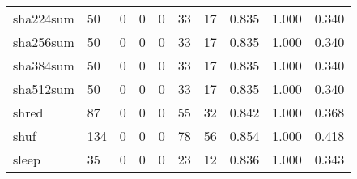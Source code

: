 \begin{longtable}{lp{1.3cm}p{1.3cm}p{1.3cm}p{1.3cm}p{1.3cm}p{1.3cm}p{1.3cm}p{1.3cm}p{1.3cm}}
sha224sum &                     50 &                                             0 &                                            0 &                                           0 &                                           33 &                                         17 &                                0.835 &                                  1.000 &                                0.340 \\
sha256sum &                     50 &                                             0 &                                            0 &                                           0 &                                           33 &                                         17 &                                0.835 &                                  1.000 &                                0.340 \\
sha384sum &                     50 &                                             0 &                                            0 &                                           0 &                                           33 &                                         17 &                                0.835 &                                  1.000 &                                0.340 \\
sha512sum &                     50 &                                             0 &                                            0 &                                           0 &                                           33 &                                         17 &                                0.835 &                                  1.000 &                                0.340 \\
shred     &                     87 &                                             0 &                                            0 &                                           0 &                                           55 &                                         32 &                                0.842 &                                  1.000 &                                0.368 \\
shuf      &                    134 &                                             0 &                                            0 &                                           0 &                                           78 &                                         56 &                                0.854 &                                  1.000 &                                0.418 \\
sleep     &                     35 &                                             0 &                                            0 &                                           0 &                                           23 &                                         12 &                                0.836 &                                  1.000 &                                0.343 \\

\end{longtable}
